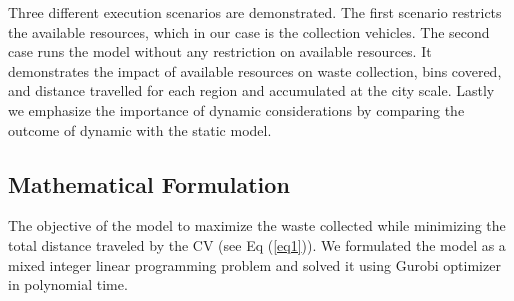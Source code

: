 \documentclass[12pt]{article}
\begin{document}
Three different execution scenarios are demonstrated. The first scenario restricts the available resources, which in our case is the collection vehicles. The second case runs the model without any restriction on available resources. It demonstrates the impact of available resources on waste collection, bins covered, and distance travelled for each region and accumulated at the city scale. Lastly we emphasize the importance of dynamic considerations by comparing the outcome of dynamic with the static model.

\subsection {Mathematical Formulation}

The objective of the model to maximize the waste collected while minimizing the total distance traveled by the CV (see Eq (\ref{eq1})). We formulated the model as a mixed integer linear programming problem and solved it using Gurobi optimizer \parencite{gurobi} in polynomial time.
\end{document}
